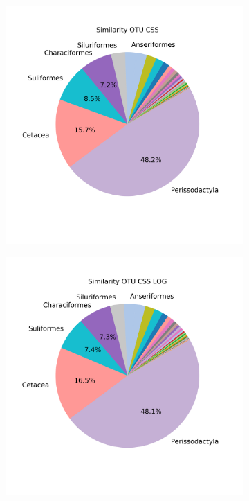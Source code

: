 \begin{figure}[h]
	\centering

	\begin{subfigure}{0.45\textwidth}
	\includegraphics[width=\textwidth]{rfr_sim_mean_pieOTU CSS}
	\caption{}
	\label{fig:simmeanotucss}
	\end{subfigure}	
	\begin{subfigure}{0.45\textwidth}
		\includegraphics[width=\textwidth]{rfr_sim_mean_pieOTU CSS LOG}

\end{subfigure}
\end{figure}
